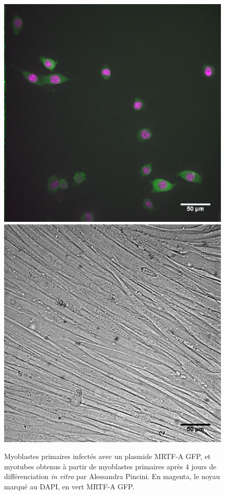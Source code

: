 \begin{figure}
\includegraphics[scale=0.25]{Figures/Myocytes.png} \includegraphics[scale=0.25]{Figures/Myotubes_flox_D4.png} 
\caption{Myoblastes primaires infectés avec un plasmide MRTF-A GFP, et myotubes obtenus à partir de myoblastes primaires après 4 jours de différenciation \textit{in vitro} par Alessandra Pincini. En magenta, le noyau marqué au DAPI, en vert MRTF-A GFP.}
\end{figure}


